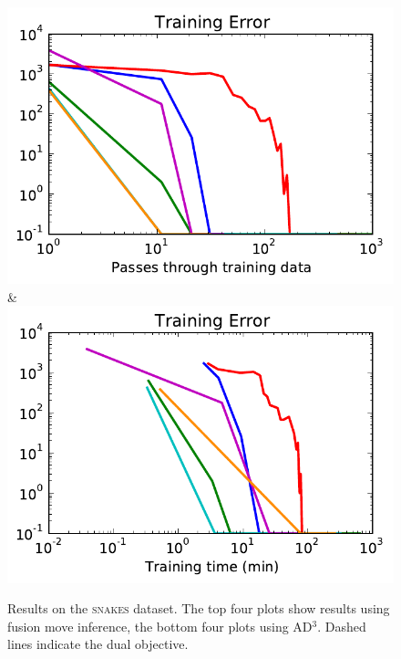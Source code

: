 \begin{figure}
\begin{tabu}
    \includegraphics[width=\linewidth]{evaluation/images/snakes_ad3_loss}&%
    \includegraphics[width=\linewidth]{evaluation/images/snakes_ad3_time_loss}
    \end{tabu}
\caption{%
    Results on the \textsc{snakes} dataset. The top four plots show results using fusion
    move inference, the bottom four plots using AD$^3$. Dashed lines indicate the dual objective.
}
\end{figure}

